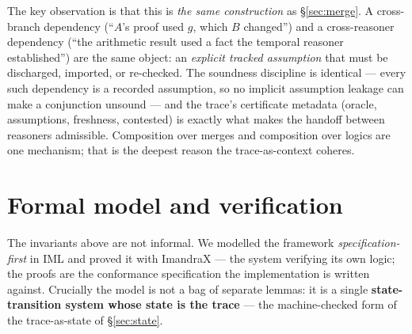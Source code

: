 \documentclass[11pt]{article}
\begin{document}
The key observation is that this is \emph{the same construction} as \S\ref{sec:merge}. A cross-branch
dependency (``$A$'s proof used $g$, which $B$ changed'') and a cross-reasoner dependency (``the arithmetic
result used a fact the temporal reasoner established'') are the same object: an \emph{explicit tracked
assumption} that must be discharged, imported, or re-checked. The soundness discipline is identical ---
every such dependency is a recorded assumption, so no implicit assumption leakage can make a conjunction
unsound --- and the trace's certificate metadata (oracle, assumptions, freshness, contested) is exactly what
makes the handoff between reasoners admissible. Composition over merges and composition over logics are one
mechanism; that is the deepest reason the trace-as-context coheres.

\section{Formal model and verification}\label{sec:proved}

The invariants above are not informal. We modelled the framework \emph{specification-first} in IML and
proved it with ImandraX --- the system verifying its own logic; the proofs are the conformance specification
the implementation is written against. Crucially the model is not a bag of separate lemmas: it is a single
\textbf{state-transition system whose state is the trace} --- the machine-checked form of the trace-as-state
of \S\ref{sec:state}.
\end{document}
